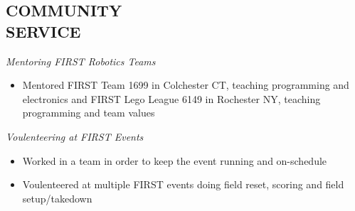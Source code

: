 \documentclass[line,margin]{res}
\begin{document}
\begin{resume}
\section{COMMUNITY \\ SERVICE}  

	{\sl Mentoring FIRST Robotics Teams}
	\begin{itemize}  
		\itemsep -2pt
		\item Mentored FIRST Team 1699 in Colchester CT, teaching programming and electronics and FIRST Lego League 6149 in Rochester NY, teaching programming and team values
	\end{itemize}

	\vspace{-8pt}
	{\sl Voulenteering at FIRST Events}
	\begin{itemize}
		\itemsep -2pt
		\item Worked in a team in order to keep the event running and on-schedule
		\item Voulenteered at multiple FIRST events doing field reset, scoring and field setup/takedown
	\end{itemize}


\end{resume}
\end{document}

